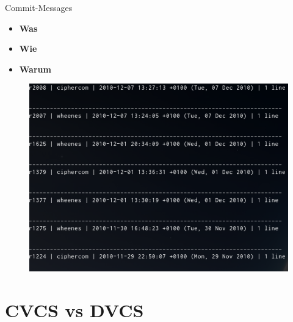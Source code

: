 \documentclass[presentation]{beamer}
\begin{document}
\begin{frame}{Commit-Messages}
  \begin{itemize}[<+->]
  \item \textbf{Was}
  \item \textbf{Wie}
  \item \textbf{Warum}
  \end{itemize}
\end{frame}
\begin{frame}
  \begin{figure}
    \centering
    \includegraphics[width=\textwidth]{img/log}
  \end{figure}
\end{frame}
\section{CVCS vs DVCS}
\end{document}
